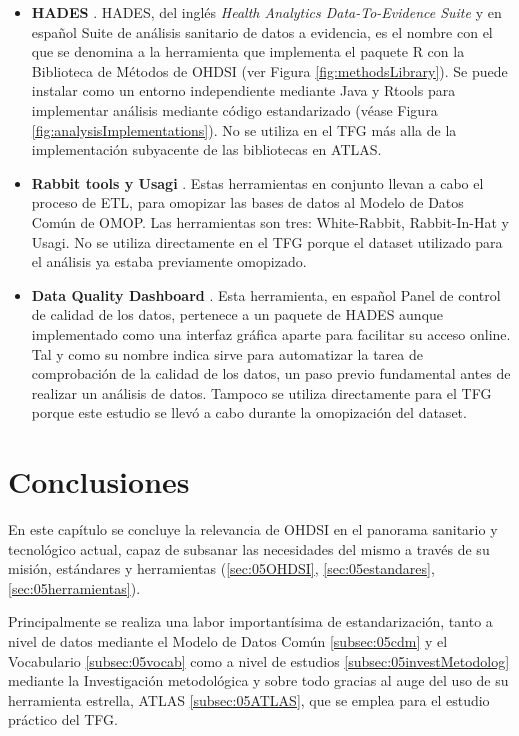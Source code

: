 \begin{itemize}
    
    \item \textbf{HADES} \cite{githubHADES}. HADES, del inglés\textit{ Health Analytics Data-To-Evidence Suite} y en español Suite de análisis sanitario de datos a evidencia, es el nombre con el que se denomina a la herramienta que implementa el paquete R con la Biblioteca de Métodos de OHDSI (ver Figura \ref{fig:methodsLibrary}). Se puede instalar como un entorno independiente mediante Java y Rtools para implementar análisis mediante código estandarizado (véase Figura \ref{fig:analysisImplementations}). No se utiliza en el TFG más alla de la implementación subyacente de las bibliotecas en ATLAS.
    \item \textbf{Rabbit tools y Usagi} \cite{OHDSIsoftTools}. Estas herramientas en conjunto llevan a cabo el proceso de ETL, para omopizar las bases de datos al Modelo de Datos Común de OMOP. Las herramientas son tres: White-Rabbit, Rabbit-In-Hat y Usagi. No se utiliza directamente en el TFG porque el dataset utilizado para el análisis ya estaba previamente omopizado.
    \item \textbf{Data Quality Dashboard} \cite{githubDQD}. Esta herramienta, en español Panel de control de calidad de los datos, pertenece a un paquete de HADES aunque implementado como una interfaz gráfica aparte para facilitar su acceso online. Tal y como su nombre indica sirve para automatizar la tarea de comprobación de la calidad de los datos, un paso previo fundamental antes de realizar un análisis de datos. Tampoco se utiliza directamente para el TFG porque este estudio se llevó a cabo durante la omopización del dataset.
        
\end{itemize}

\section{Conclusiones} \label{sec:05conclusion}

En este capítulo se concluye la relevancia de OHDSI en el panorama sanitario y tecnológico actual, capaz de subsanar las necesidades del mismo a través de su misión, estándares y herramientas (\ref{sec:05OHDSI}, \ref{sec:05estandares}, \ref{sec:05herramientas}).

Principalmente se realiza una labor importantísima de estandarización, tanto a nivel de datos mediante el Modelo de Datos Común \ref{subsec:05cdm} y el Vocabulario \ref{subsec:05vocab} como a nivel de estudios \ref{subsec:05investMetodolog} mediante la Investigación metodológica y sobre todo gracias al auge del uso de su herramienta estrella, ATLAS \ref{subsec:05ATLAS}, que se emplea para el estudio práctico del TFG.